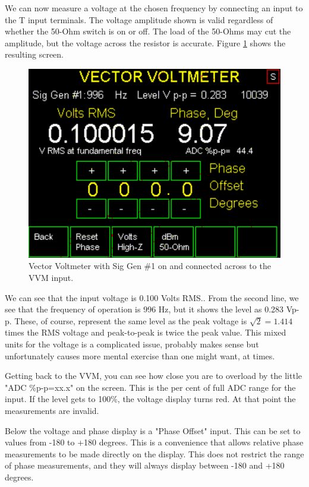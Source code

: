 We can now measure a voltage at the chosen frequency by connecting an input to the T input terminals.  The voltage amplitude shown is valid regardless of whether the 50-Ohm switch is on or off.  The load of the 50-Ohms may cut the amplitude, but the voltage across the resistor is accurate.  Figure  \ref{AVNA_016-label} shows the resulting screen.
%
\begin{figure}[H]
\begin{center}
\includegraphics[scale=0.75]{./images/AVNA_016.pdf}
\caption{Vector Voltmeter with Sig Gen \#1 on and connected across to the VVM input.}
\label{AVNA_016-label}
\end{center}
\end{figure}
%
We can see that the input voltage is 0.100 Volts RMS..  From the second line, we see that the frequency of operation is 996 Hz, but it shows the level as 0.283 Vp-p.  These, of course, represent the same level  as the peak voltage is $\sqrt{2} = 1.414$ times the RMS voltage and peak-to-peak is twice the peak value.   This mixed units for the voltage is a complicated issue, probably makes sense but unfortunately causes more mental exercise than one might want, at times.

 Getting back to the VVM, you can see how close you are to overload by the little "\textsf{ADC \%p-p=xx.x}" on the screen.  This is the per cent of full ADC range for  the input.  If the level gets to 100\%, the voltage display turns red.  At that point the measurements are invalid.

Below the voltage and phase display is a "\textsf{Phase Offset}" input.  This can be set to values from -180 to +180 degrees.  This is a convenience that allows relative phase measurements to be made directly on the display.  This does not restrict the range of phase measurements, and they will always display between -180 and +180 degrees.

